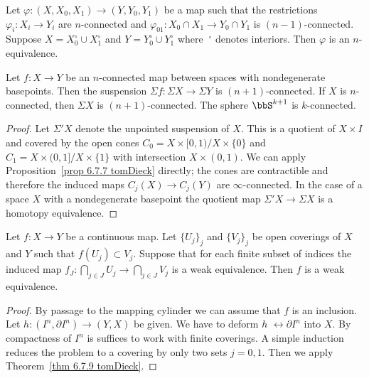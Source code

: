 \begin{thm}\label{thm 6.7.9 tomDieck}
    Let $\varphi:(X,X_0,X_1)\to (Y,Y_0,Y_1)$ be a map such that the restrictions $\varphi_i:X_i\to Y_i$ are $n$-connected and $\varphi_{01}:X_0\cap X_1\to Y_0\cap Y_1$ is $(n-1)$-connected. Suppose $X=X_0^\circ \cup X_1^\circ$ and $Y=Y_0^\circ \cup Y_1^\circ$ where $\ ^\circ$ denotes interiors. Then $\varphi $ is an $n$-equivalence.
\end{thm}

\begin{cor}\label{prop 6.7.10 tomDieck}
    Let $f:X\to Y$ be an $n$-connected map between spaces with nondegenerate basepoints. Then the suspension $\Sigma f:\Sigma X\to \Sigma Y$ is $(n+1)$-connected. If $X$ is $n$-connected, then $\Sigma X$ is $(n+1)$-connected. The sphere $\bbS^{k+1}$ is $k$-connected.
\end{cor}
\begin{proof}
    Let $\Sigma 'X$ denote the unpointed suspension of $X$. This is a quotient of $X\times I$ and covered by the open cones $C_0=X\times [0,1)\slash X\times\{0\}$ and $C_1=X\times (0,1]\slash X\times\{1\}$ with intersection $X\times (0,1)$. We can apply Proposition~\ref{prop 6.7.7 tomDieck} directly; the cones are contractible and therefore the induced maps $C_j(X)\to C_j(Y)$ are $\infty$-connected. In the case of a space $X$ with a nondegenerate basepoint the quotient map $\Sigma 'X\to \Sigma X$ is a homotopy equivalence.
\end{proof}

\begin{thm}\label{thm 6.7.11 tomDieck}
    Let $f:X\to Y$ be a continuous map. Let $\{U_j\}_j$ and $\{V_j\}_j$ be open coverings of $X$ and $Y$ such that $f(U_j)\subset V_j$. Suppose that for each finite subset of indices the induced map $f_J:\bigcap_{j\in J}U_j\to \bigcap_{j\in J}V_j$ is a weak equivalence. Then $f$ is a weak equivalence.
\end{thm}
\begin{proof}
    By passage to the mapping cylinder we can assume that $f$ is an inclusion. Let $h:(I^n,\partial I^n)\to (Y,X)$ be given. We have to deform $h$ $\rel \partial I^n$ into $X$. By compactness of $I^n$ is suffices to work with finite coverings. A simple induction reduces the problem to a covering by only two sets $j=0,1$. Then we apply Theorem~\ref{thm 6.7.9 tomDieck}.
\end{proof}






